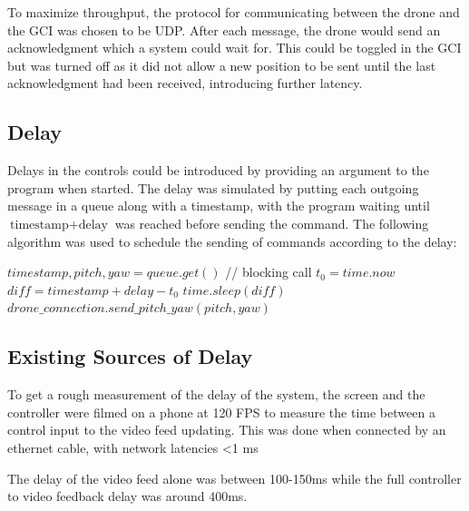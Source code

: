 \documentclass[nofilelist]{cslthse-msc}
\begin{document}
To maximize throughput, the protocol for communicating between the drone and the GCI was chosen to be UDP. After each message, the drone would send an acknowledgment which a system could wait for. This could be toggled in the GCI but was turned off as it did not allow a new position to be sent until the last acknowledgment had been received, introducing further latency.

\subsection{Delay}
Delays in the controls could be introduced by providing an argument to the program when started. The delay was simulated by putting each outgoing message in a queue along with a timestamp, with the program waiting until $ \text{timestamp} + \text{delay} $ was reached before sending the command. The following algorithm was used to schedule the sending of commands according to the delay: 
\begin{algorithmic}
   \State $timestamp, pitch, yaw = queue.get()$ // blocking call
   \State $t_{0} = time.now$
   \State $diff = timestamp + delay - t_{0}$
      \State $time.sleep(diff)$
   \EndIf
   \State $drone\_connection.send\_pitch\_yaw(pitch, yaw)$
   \EndWhile
\end{algorithmic}

\subsection{Existing Sources of Delay}
To get a rough measurement of the delay of the system, the screen and the controller were filmed on a phone at 120 FPS to measure the time between a control input to the video feed updating. This was done when connected by an ethernet cable, with network latencies <1 ms

The delay of the video feed alone was between 100-150ms while the full controller to video feedback delay was around 400ms. 
\end{document}
